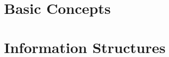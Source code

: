\documentclass[main.tex]{subfiles}
\begin{document}
\chapter{Basic Concepts}


\chapter{Information Structures}

\end{document}
